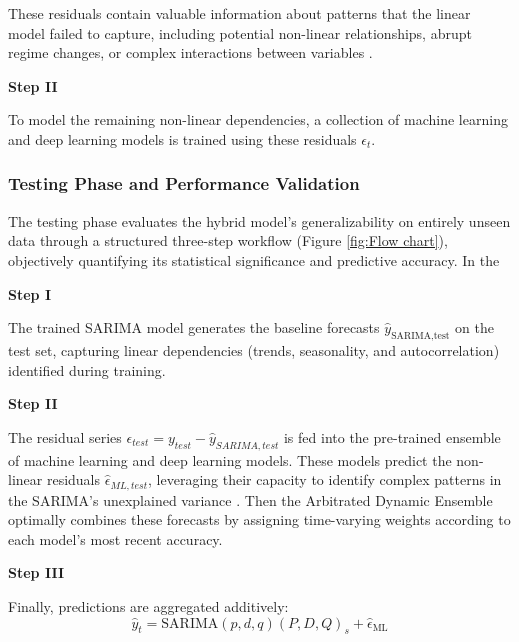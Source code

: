 These residuals contain valuable information about patterns that the linear model failed to capture, including potential non-linear relationships, abrupt regime changes, or complex interactions between variables \cite{Khashei2011}.

\textbf{Step II}

To model the remaining non-linear dependencies, a collection of machine learning and deep learning models is trained using these residuals $\epsilon_t$.


\subsubsection{Testing Phase and Performance Validation}
The testing phase evaluates the hybrid model’s generalizability on entirely  unseen data through a structured three-step workflow (Figure \ref{fig:Flow chart}), objectively quantifying its statistical significance and predictive accuracy. In the 

\textbf{Step I}

The trained SARIMA model generates the baseline forecasts \(\hat{y}_{\text{SARIMA,test}}\) on the test set, capturing linear dependencies (trends, seasonality, and autocorrelation) identified during training.

\textbf{Step II}

The residual series $\epsilon_{test} = y_{test} - \hat{y}_{SARIMA,test}$ is fed into the pre-trained ensemble of machine learning and deep learning models. These models predict the non-linear residuals $\hat{\epsilon}_{ML,test}$, leveraging their capacity to identify complex patterns in the SARIMA’s unexplained variance \cite{Goodfellow2016}. Then the Arbitrated Dynamic Ensemble optimally combines these forecasts by assigning time-varying weights according to each model's most recent accuracy.

\textbf{Step III}

Finally, predictions are aggregated additively:
\[
\hat{y}_t = \text{SARIMA}(p, d, q)(P, D, Q)_s + \hat{\epsilon}_{\text{ML}}
\]

